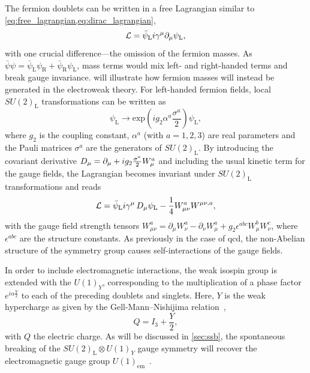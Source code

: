 The fermion doublets can be written in a free Lagrangian similar to \cref{eq:free_lagrangian,eq:dirac_lagrangian},
\begin{equation}
	\mathcal{L} = \bar{\psi}_\mathrm{L}i\gamma^\mu\partial_\mu\psi_\mathrm{L},
\end{equation}
with one crucial difference---the omission of the fermion masses. As $\bar{\psi}\psi = \bar{\psi}_\mathrm{L}\psi_\mathrm{R} + \bar{\psi}_\mathrm{R}\psi_\mathrm{L}$, mass terms would mix left- and right-handed terms and break gauge invariance.  will illustrate how fermion masses will instead be generated in the electroweak theory. For left-handed fermion fields, local $SU(2)_\mathrm{L}$ transformations can be written as
\begin{equation}
	\psi_\mathrm{L} \rightarrow \mathrm{exp}\left(ig_2\alpha^a\frac{\sigma^a}{2}\right)\psi_\mathrm{L},
\end{equation}  
where $g_2$ is the coupling constant, $\alpha^a$ (with $a=1,2,3$) are real parameters and the Pauli matrices $\sigma^a$ are the generators of $SU(2)_\mathrm{L}$. By introducing the covariant derivative $\mathop{}\!D_\mu = \partial_\mu + ig_2\frac{\sigma^a}{2}W^a_\mu$ and including the usual kinetic term for the gauge fields, the Lagrangian becomes invariant under $SU(2)_\mathrm{L}$ transformations and reads
\begin{equation}
	\mathcal{L} = \bar{\psi}_\mathrm{L}i\gamma^\mu\mathop{}\!D_\mu\psi_\mathrm{L} - \frac{1}{4}W^a_{\mu\nu}W^{\mu\nu,a},
\end{equation}
with the gauge field strength tensors $W^a_{\mu\nu} = \partial_\mu W^a_\nu - \partial_\nu W^a_\mu + g_2 \epsilon^{abc}W^b_\mu W^c_\nu$, where $\epsilon^{abc}$ are the structure constants. As previously in the case of \gls{qcd}, the non-Abelian structure of the symmetry group causes self-interactions of the gauge fields.

In order to include electromagnetic interactions, the weak isospin group is extended with the $U(1)_Y$, corresponding to the multiplication of a phase factor $e^{i\alpha\frac{Y}{2}}$ to each of the preceding doublets and singlets. Here, $Y$ is the weak hypercharge as given by the Gell-Mann--Nishijima relation~\cite{Gell-Mann1956,10.1143/PTP.13.285,10.1143/PTP.10.581},
\begin{equation}
	Q = I_3 + \frac{Y}{2},
	\label{eq:gell-mann-nishijima}
\end{equation}
with $Q$ the electric charge.
As will be discussed in \cref{sec:ssb}, the spontaneous breaking of the \mbox{$SU(2)_\mathrm{L}\otimes U(1)_Y$} gauge symmetry will recover the electromagnetic gauge group $U(1)_\mathrm{em}$~\cite{Peskin:1995ev}.

